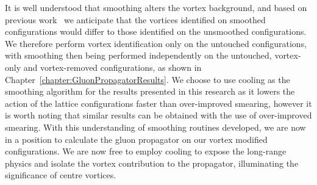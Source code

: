 It is well understood that smoothing alters the vortex background, and based on previous work~\cite{Cais:2008za,Trewartha:2015ida,DelDebbio:1998luz} we anticipate that the vortices identified on smoothed configurations would differ to those identified on the unsmoothed configurations. We therefore perform vortex identification only on the untouched configurations, with smoothing then being performed independently on the untouched, vortex-only and vortex-removed configurations, as shown in Chapter~\ref{chapter:GluonPropagatorResults}. We choose to use cooling as the smoothing algorithm for the results presented in this research as it lowers the action of the lattice configurations faster than over-improved smearing, however it is worth noting that similar results can be obtained with the use of over-improved smearing. With this understanding of smoothing routines developed, we are now in a position to calculate the gluon propagator on our vortex modified configurations. We are now free to employ cooling to expose the long-range physics and isolate the vortex contribution to the propagator, illuminating the significance of centre vortices. 

